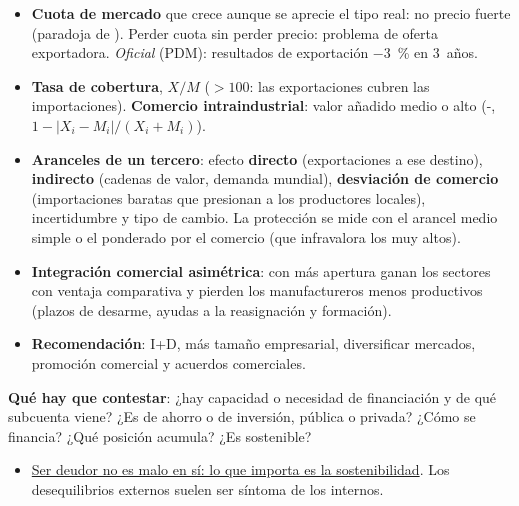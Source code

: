 \documentclass{article}
\begin{document}
\begin{columnas}
\begin{itemize}[itemsep=1.5pt]
\item \textbf{Cuota de mercado} que crece aunque se aprecie el tipo real: no precio fuerte (paradoja de ). Perder cuota sin perder precio: problema de oferta exportadora. \emph{Oficial} (PDM): resultados de exportación $-3$~\% en 3~años.
\item \textbf{Tasa de cobertura}, $X/M$ ($>100$: las exportaciones cubren las importaciones). \textbf{Comercio intraindustrial}: valor añadido medio o alto (-, $1-|X_i-M_i|/(X_i+M_i)$).
\item \textbf{Aranceles de un tercero}: efecto \textbf{directo} (exportaciones a ese destino), \textbf{indirecto} (cadenas de valor, demanda mundial), \textbf{desviación de comercio} (importaciones baratas que presionan a los productores locales), incertidumbre y tipo de cambio. La protección se mide con el arancel medio simple o el ponderado por el comercio (que infravalora los muy altos).
\item \textbf{Integración comercial asimétrica}: con más apertura ganan los sectores con ventaja comparativa y pierden los manufactureros menos productivos (plazos de desarme, ayudas a la reasignación y formación).
\item \textbf{Recomendación}: I+D, más tamaño empresarial, diversificar mercados, promoción comercial y acuerdos comerciales.
\end{itemize}

\begin{ideaclave}
\textbf{Qué hay que contestar}: ¿hay capacidad o necesidad de financiación y de qué subcuenta viene? ¿Es de ahorro o de inversión, pública o privada? ¿Cómo se financia? ¿Qué posición acumula? ¿Es sostenible?
\end{ideaclave}
\begin{itemize}[itemsep=1.5pt]
\item \uline{Ser deudor no es malo en sí: lo que importa es la sostenibilidad}. Los desequilibrios externos suelen ser síntoma de los internos.
\end{itemize}


\end{columnas}
\end{document}
